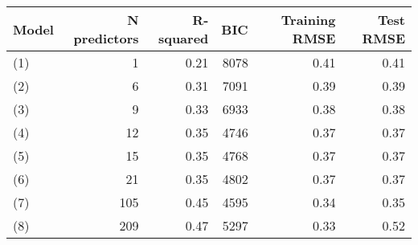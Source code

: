 \begin{tabular}{lrrrrr}
  \toprule
Model & N predictors & R-squared & BIC & Training RMSE & Test RMSE \\ 
  \midrule
(1) & 1 & 0.21 & 8078 & 0.41 & 0.41 \\ 
  (2) & 6 & 0.31 & 7091 & 0.39 & 0.39 \\ 
  (3) & 9 & 0.33 & 6933 & 0.38 & 0.38 \\ 
  (4) & 12 & 0.35 & 4746 & 0.37 & 0.37 \\ 
  (5) & 15 & 0.35 & 4768 & 0.37 & 0.37 \\ 
  (6) & 21 & 0.35 & 4802 & 0.37 & 0.37 \\ 
  (7) & 105 & 0.45 & 4595 & 0.34 & 0.35 \\ 
  (8) & 209 & 0.47 & 5297 & 0.33 & 0.52 \\ 
   \bottomrule
\end{tabular}
